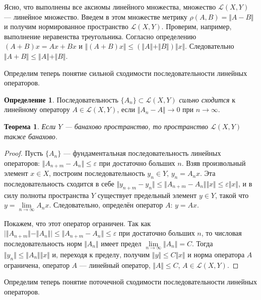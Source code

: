 \documentclass[12pt,a4paper,titlepage,oneside]{book}
\theoremstyle{definition}
\newtheorem*{definition}{Определение}
\theoremstyle{plain}
\newtheorem*{theorem}{Теорема}
\theoremstyle{break}
\theoremstyle{remark}
\theoremstyle{remark}
\theoremstyle{remark}
\theoremstyle{remark}
\theoremstyle{plain}
\theoremstyle{plain}
\begin{document}
Ясно, что выполнены все аксиомы линейного множества, множество $\mathcal{L}(X,Y)$ --- линейное множество. Введем в этом множестве метрику $\rho(A, B) = \Vert A-B \Vert$ и получим нормированное пространство $\mathcal{L}(X,Y)$. Проверим, например, выполнение неравенства треугольника. Согласно определению $(A+B)x = Ax+Bx$ и $\Vert(A+B)x\Vert\le(\Vert A\Vert+\Vert B\Vert)\Vert x\Vert$. Следовательно $\Vert A+B\Vert\le\Vert A\Vert+\Vert B\Vert$.

Определим теперь понятие сильной сходимости последовательности линейных операторов.

\begin{definition}
Последовательность $\{A_n\} \subset \mathcal{L}(X,Y)$ \textit{сильно сходится} к линейному оператору $A\in \mathcal{L}(X,Y)$, если $\Vert A_n-A \Vert \to 0$ при $n\to {\infty}$.
\end{definition}

\begin{theorem}
Если $Y$ --- банахово пространство, то пространство $\mathcal{L}(X,Y)$ также банахово.
\end{theorem}

\begin{proof}
Пусть $\{A_n\}$ --- фундаментальная последовательность линейных операторов: $\Vert A_{n+m} - A_n \Vert \leqslant \varepsilon$ при достаточно больших $n$. Взяв произвольный элемент $x \in X$, построим последовательность $y_n \in Y$, $y_n = A_nx$. Эта последовательность сходится в себе $\Vert y_{n+m} - y_n\Vert \leqslant \Vert A_{n+m} - A_n\Vert \Vert x\Vert \leqslant \varepsilon \Vert x\Vert$, и в силу полноты пространства $Y$ существует предельный элемент $y \in Y$, такой что $y=\lim \limits_{n \to \infty} A_n x$. Следовательно, определён оператор $A$: $y = Ax$.

Покажем, что этот оператор ограничен. Так как $ \big\lvert \Vert A_{n+m} \Vert - \Vert A_n\Vert \big\rvert \leqslant \Vert A_{n+m} - A_n \Vert \leqslant \varepsilon$ при достаточно больших $n$, то числовая последовательность норм $\Vert A_n\Vert$ имеет предел $\lim \limits_{n\to \infty} \Vert A_n\Vert=C$. Тогда $\Vert y_n \Vert \leqslant \Vert A_n\Vert \Vert x\Vert$ и, переходя к пределу, получим $\Vert y \Vert \leqslant C \Vert x \Vert$ и норма оператора $A$ ограничена, оператор $A$ --- линейный оператор, $\Vert A\Vert \leqslant C$, $A \in \mathcal{L}(X,Y)$.
\end{proof}

Определим теперь понятие поточечной сходимости последовательности линейных операторов.
\end{document}
